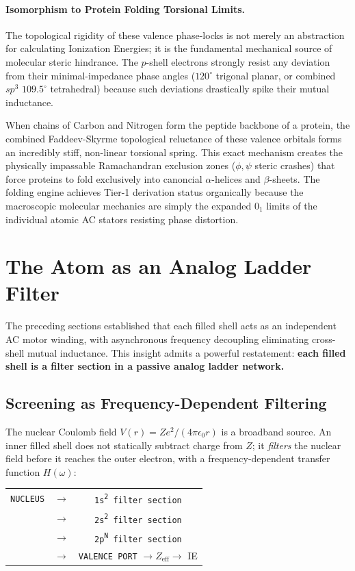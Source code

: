 \paragraph{Isomorphism to Protein Folding Torsional Limits.}
The topological rigidity of these valence phase-locks is not merely an abstraction for calculating Ionization Energies; it is the fundamental mechanical source of molecular steric hindrance. The $p$-shell electrons strongly resist any deviation from their minimal-impedance phase angles ($120^\circ$ trigonal planar, or combined $sp^3$ $109.5^\circ$ tetrahedral) because such deviations drastically spike their mutual inductance. 

When chains of Carbon and Nitrogen form the peptide backbone of a protein, the combined Faddeev-Skyrme topological reluctance of these valence orbitals forms an incredibly stiff, non-linear torsional spring. This exact mechanism creates the physically impassable Ramachandran exclusion zones ($\phi, \psi$ steric crashes) that force proteins to fold exclusively into canoncial $\alpha$-helices and $\beta$-sheets. The folding engine achieves Tier-1 derivation status organically because the macroscopic molecular mechanics are simply the expanded $0_1$ limits of the individual atomic AC stators resisting phase distortion.

\section{The Atom as an Analog Ladder Filter}
\label{sec:analog_ladder_filter}

The preceding sections established that each filled shell acts as an independent AC motor winding, with asynchronous frequency decoupling eliminating cross-shell mutual inductance. This insight admits a powerful restatement: \textbf{each filled shell is a filter section in a passive analog ladder network.}

\subsection{Screening as Frequency-Dependent Filtering}

The nuclear Coulomb field $V(r) = Ze^2/(4\pi\epsilon_0 r)$ is a broadband source. An inner filled shell does not statically subtract charge from $Z$; it \emph{filters} the nuclear field before it reaches the outer electron, with a frequency-dependent transfer function $H(\omega)$:

\begin{center}
\small
\begin{tabular}{ccc}
\texttt{NUCLEUS} & $\longrightarrow$ & \texttt{1s\textsuperscript{2} filter section} \\
& $\longrightarrow$ & \texttt{2s\textsuperscript{2} filter section} \\
& $\longrightarrow$ & \texttt{2p\textsuperscript{N} filter section} \\
& $\longrightarrow$ & \texttt{VALENCE PORT} $\rightarrow Z_\text{eff} \rightarrow$ IE
\end{tabular}
\end{center}


